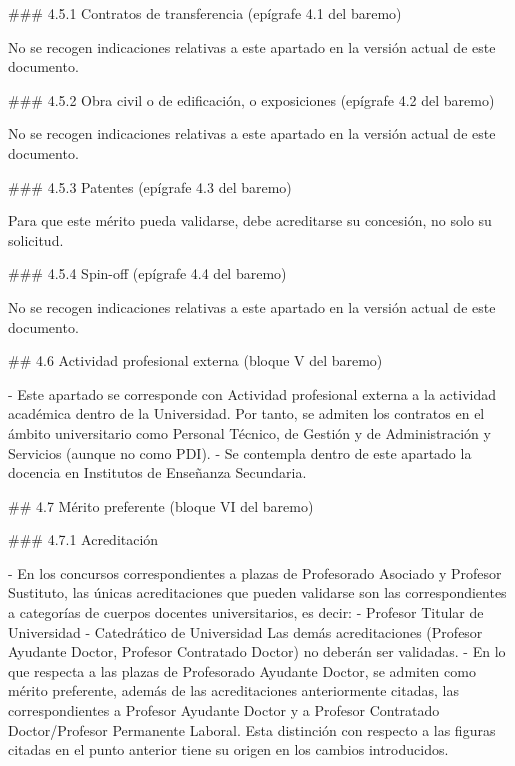 \documentclass{article}
\begin{document}
\begin{itemize}
\begin{itemize}
\begin{scriptsize}
                  \#\#\# 4.5.1 Contratos de transferencia (epígrafe 4.1 del baremo)

                  No se recogen indicaciones relativas a este apartado en la versión actual de este documento.

                  \#\#\# 4.5.2 Obra civil o de edificación, o exposiciones (epígrafe 4.2 del baremo)

                  No se recogen indicaciones relativas a este apartado en la versión actual de este documento.

                  \#\#\# 4.5.3 Patentes (epígrafe 4.3 del baremo)

                  Para que este mérito pueda validarse, debe acreditarse su concesión, no solo su solicitud.

                  \#\#\# 4.5.4 Spin-off (epígrafe 4.4 del baremo)

                  No se recogen indicaciones relativas a este apartado en la versión actual de este documento.

                  \#\# 4.6 Actividad profesional externa (bloque V del baremo)

                  - Este apartado se corresponde con Actividad profesional externa a la actividad académica dentro de la Universidad. Por tanto, se admiten los contratos en el ámbito universitario como Personal Técnico, de Gestión y de Administración y Servicios (aunque no como PDI).
                  - Se contempla dentro de este apartado la docencia en Institutos de Enseñanza Secundaria.

                  \#\# 4.7 Mérito preferente (bloque VI del baremo)

                  \#\#\# 4.7.1 Acreditación

                  - En los concursos correspondientes a plazas de Profesorado Asociado y Profesor Sustituto, las únicas acreditaciones que pueden validarse son las correspondientes a categorías de cuerpos docentes universitarios, es decir:
                  - Profesor Titular de Universidad
                  - Catedrático de Universidad
                  Las demás acreditaciones (Profesor Ayudante Doctor, Profesor Contratado Doctor) no deberán ser validadas.
                  - En lo que respecta a las plazas de Profesorado Ayudante Doctor, se admiten como mérito preferente, además de las acreditaciones anteriormente citadas, las correspondientes a Profesor Ayudante Doctor y a Profesor Contratado Doctor/Profesor Permanente Laboral. Esta distinción con respecto a las figuras citadas en el punto anterior tiene su origen en los cambios introducidos.


\end{scriptsize}
\end{itemize}
\end{itemize}
\end{document}

